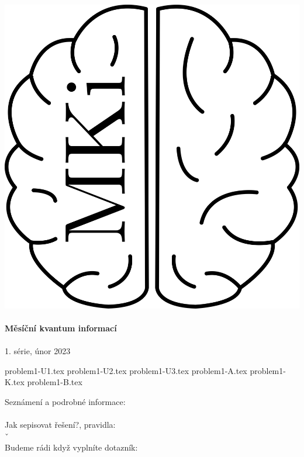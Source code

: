 \documentclass[12pt]{article}
\begin{document}
\thispagestyle{firststyle}
\vspace*{\fill}
\begin{center}
\includegraphics[scale=1]{../../../../propagace/logo/mkilogo.png}\\
\quad\\
\textbf{\Huge{Měsíční kvantum informací}}\\
\quad\\
\LARGE{1. série, únor 2023}
\end{center}
\vspace*{\fill}

\newpage
{problem1-U1.tex}
\newpage
{problem1-U2.tex}
{problem1-U3.tex}
{problem1-A.tex}
{problem1-K.tex}
{problem1-B.tex}
\newpage

Seznámení a podrobné informace:\\
\\

Jak sepisovat řešení?, pravidla:\\
ˇ%
\\

Budeme rádi když vyplníte dotazník:\\
\\

\vspace*{\fill}
\end{document}
